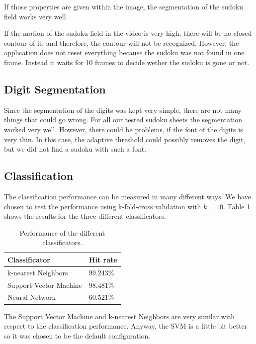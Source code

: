 \documentclass[
a4paper,     %
12pt         %
]{scrartcl}  %
\begin{document}
If those properties are given within the image, the segmentation of the sudoku field works very well. 

If the motion of the sudoku field in the video is very high, there will be no closed contour of it,
and therefore, the contour will not be recognized. However, the application does not reset everything because
the sudoku was not found in one frame. Instead it waits for 10 frames to decide wether the sudoku is gone
or not.

\subsection{Digit Segmentation}
\label{sec:class_perf}

Since the segmentation of the digits was kept very simple, there are not many things that could go
wrong. For all our tested sudoku sheets the segmentation worked very well. However, there could
be problems, if the font of the digits is very thin. In this case, the adaptive threshold could
possibly removes the digit, but we did not find a sudoku with such a font.

\subsection{Classification}

The classification performance can be measured in many different ways. We have chosen to test the
performance using k-fold-cross validation with $k=10$. Table \ref{tab:class_perf} shows the results
for the three different classificators.

\begin{table}
    \centering
    \begin{tabular}{|l|l|}
    \hline
    \textbf{Classificator}          & \textbf{Hit rate}   \\ \hline
    k-nearest Neighbors    & $ 99.243\%$ \\ \hline
    Support Vector Machine & $ 98.481\%$    \\ \hline
    Neural Network         & $ 60.521\%$    \\ \hline
    \end{tabular}
    \caption{Performance of the different classificators.}
    \label{tab:class_perf}
\end{table}

The Support Vector Machine and k-nearest Neighbors are very similar with respect to the classification
performance. Anyway, the SVM is a little bit better so it was chosen to be the default configuration.
\end{document}

